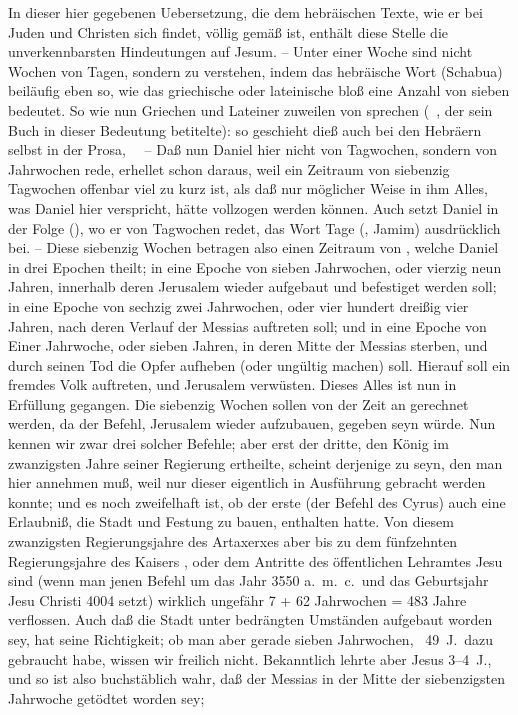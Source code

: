 \begin{aufza}
\item[]In dieser hier gegebenen Uebersetzung, die dem hebräischen Texte, wie er bei Juden und Christen sich findet, völlig gemäß ist, enthält diese Stelle die unverkennbarsten Hindeutungen auf Jesum. -- Unter einer Woche sind nicht Wochen von Tagen, sondern  zu verstehen, indem das hebräische Wort  (Schabua) beiläufig eben so, wie das griechische oder lateinische  bloß eine Anzahl von sieben bedeutet. So wie nun Griechen und Lateiner zuweilen von  sprechen (\zB\ , der sein Buch  in dieser Bedeutung betitelte): so geschieht dieß auch bei den Hebräern selbst in der Prosa, \zB\ \ -- Daß nun Daniel hier nicht von Tagwochen, sondern von Jahrwochen rede, erhellet schon daraus, weil ein Zeitraum von siebenzig Tagwochen offenbar viel zu kurz ist, als daß nur möglicher Weise in ihm Alles, was Daniel hier verspricht, hätte vollzogen werden können. Auch setzt Daniel in der Folge (), wo er von Tagwochen redet, das Wort Tage (, Jamim) ausdrücklich bei. -- Diese siebenzig Wochen betragen also einen Zeitraum von , welche Daniel in drei Epochen theilt; in eine Epoche von sieben Jahrwochen, oder vierzig neun Jahren, innerhalb deren Jerusalem wieder aufgebaut und befestiget werden soll; in eine Epoche von sechzig zwei Jahrwochen, oder vier hundert dreißig vier Jahren, nach deren Verlauf der Messias auftreten soll; und in eine Epoche von Einer Jahrwoche, oder sieben Jahren, in deren Mitte der Messias sterben, und durch seinen Tod die Opfer aufheben (oder ungültig machen) soll. Hierauf soll ein fremdes Volk auftreten, und Jerusalem verwüsten. Dieses Alles ist nun in Erfüllung gegangen. Die siebenzig Wochen sollen von der Zeit an gerechnet werden, da der Befehl, Jerusalem wieder aufzubauen, gegeben seyn würde. Nun kennen wir zwar drei solcher Befehle; aber erst der dritte, den König  im zwanzigsten Jahre seiner Regierung ertheilte, scheint derjenige zu seyn, den man hier annehmen muß, weil nur dieser eigentlich in Ausführung gebracht werden konnte; und es noch zweifelhaft ist, ob der erste (der Befehl des Cyrus) auch eine Erlaubniß, die Stadt und Festung zu bauen, enthalten hatte. Von diesem zwanzigsten Regierungsjahre des Artaxerxes aber bis zu dem fünfzehnten Regierungsjahre des Kaisers , oder dem Antritte des öffentlichen Lehramtes Jesu sind (wenn man jenen Befehl um das Jahr 3550 a.~m.~c.\ und das Geburtsjahr Jesu Christi 4004 setzt) wirklich ungefähr 7 + 62 Jahrwochen = 483 Jahre verflossen. Auch daß die Stadt unter bedrängten Umständen aufgebaut worden sey, hat seine Richtigkeit; ob man aber gerade sieben Jahrwochen, \di\ 49~J.\ dazu gebraucht habe, wissen wir freilich nicht. Bekanntlich lehrte aber Jesus 3--4~J., und so ist also buchstäblich wahr, daß der Messias in der Mitte der siebenzigsten Jahrwoche getödtet worden sey; \usw

\end{aufza}
